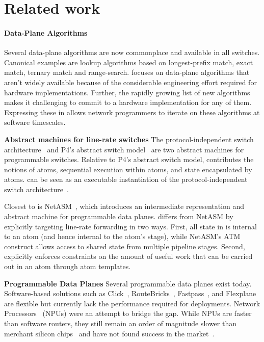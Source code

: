 \section{Related work}
\label{s:related}

\paragraph{Data-Plane Algorithms}
Several data-plane algorithms are now commonplace and available in all
switches. Canonical examples are lookup algorithms based on longest-prefix
match, exact match, ternary match and range-search. \pktlanguage focuses on
data-plane algorithms that aren't widely available because of the considerable
engineering effort required for hardware implementations. Further, the rapidly
growing list of new algorithms~\cite{pdq, d3, detail, codel, conga} makes it
challenging to commit to a hardware implementation for any of them.  Expressing
these in \pktlanguage allows network programmers to iterate on these algorithms
at software timescales.

\textbf{Abstract machines for line-rate switches}
The protocol-independent switch architecture~\cite{nick_p4} and P4's abstract
switch model~\cite{p4} are two abstract machines for programmable switches.
Relative to P4's abstract switch model, \absmachine contributes the notions of
atoms, sequential execution within atoms, and state encapsulated by atoms.
\absmachine can be seen as an executable instantiation of the
protocol-independent switch architecture~\cite{nick_p4}.

Closest to \absmachine is NetASM~\cite{netasm}, which introduces an
intermediate representation and abstract machine for programmable data planes.
\absmachine differs from NetASM by explicitly targeting line-rate forwarding in
two ways.  First, all state in \absmachine is internal to an atom (and hence
internal to the atom's stage), while NetASM's ATM construct allows access to
shared state from multiple pipeline stages. Second, \absmachine explicitly
enforces constraints on the amount of useful work that can be carried out in an
atom through atom templates.

\textbf{Programmable Data Planes}
Several programmable data planes exist today. Software-based solutions such as
Click~\cite{click}, RouteBricks~\cite{routebricks}, Fastpass~\cite{fastpass},
and Flexplane~\cite{flexplane} are flexible but currently lack the performance
required for deployments. Network Processors~\cite{ixp2800, ixp4xx} (NPUs) were
an attempt to bridge the gap.  While NPUs are faster than software routers,
they still remain an order of magnitude slower than merchant silicon
chips~\cite{rmt} and have not found success in the market~\cite{npfail}.

